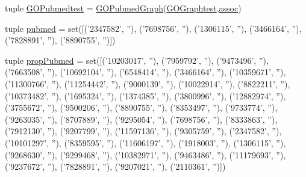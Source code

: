 \begin{DoxyCompactItemize}
\item 
tuple \hyperlink{namespacetest_a2565076d50762c7d466830ecbabb1671}{GOPubmedtest} = \hyperlink{class_g_o_pubmed_graph_1_1_g_o_pubmed_graph}{GOPubmedGraph}(\hyperlink{namespacetest_a49256f3800de70e9aabf11ea0c3bb8e1}{GOGraphtest},\hyperlink{namespacetest_adb8b1e2a5df72522e42bc012571e75cd}{assoc})
\item 
tuple \hyperlink{namespacetest_aa3b15c95748b55bb3ace649b708b6133}{pubmed} = set(\mbox{[}('2347582', ''), ('7698756', ''), ('1306115', ''), ('3466164', ''), ('7828891', ''), ('8890755', '')\mbox{]})
\item 
tuple \hyperlink{namespacetest_adc1d0604ecf3fb36f0df45313768ab39}{propPubmed} = set(\mbox{[}('10203017', ''), ('7959792', ''), ('9473496', ''), ('7663508', ''), ('10692104', ''), ('6548414', ''), ('3466164', ''), ('10359671', ''), ('11300766', ''), ('11254442', ''), ('9000139', ''), ('10022914', ''), ('8822211', ''), ('10373482', ''), ('1695324', ''), ('1374385', ''), ('3800996', ''), ('12882974', ''), ('3755672', ''), ('9500206', ''), ('8890755', ''), ('8353497', ''), ('9733774', ''), ('9263035', ''), ('8707889', ''), ('9295054', ''), ('7698756', ''), ('8333863', ''), ('7912130', ''), ('9207799', ''), ('11597136', ''), ('9305759', ''), ('2347582', ''), ('10101297', ''), ('8359595', ''), ('11606197', ''), ('1918003', ''), ('1306115', ''), ('9268630', ''), ('9299468', ''), ('10382971', ''), ('9463486', ''), ('11179693', ''), ('9237672', ''), ('7828891', ''), ('9207021', ''), ('2110361', '')\mbox{]})
\end{DoxyCompactItemize}


